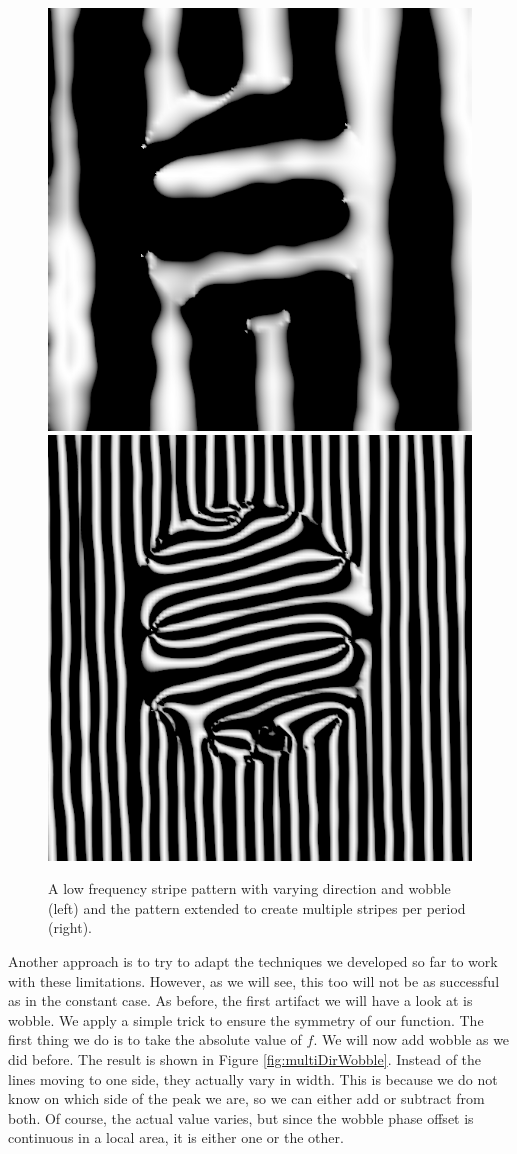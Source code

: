 \documentclass{utue} %
\begin{document}
\begin{figure}[ht]
  \centering
  \includegraphics[width=0.49\linewidth]{images/multiStripe}
  \includegraphics[width=0.49\linewidth]{images/multiStripeMulti}
  \caption{A low frequency stripe pattern with varying direction and wobble (left) and the pattern extended to create multiple stripes per period (right).}\label{fig:multiStripe}
\end{figure}

Another approach is to try to adapt the techniques we developed so far to work with these limitations. However, as we will see, this too will not be as successful as in the constant case. As before, the first artifact we will have a look at is wobble. We apply a simple trick to ensure the symmetry of our function. The first thing we do is to take the absolute value of $f$. We will now add wobble as we did before. The result is shown in Figure \ref{fig:multiDirWobble}. Instead of the lines moving to one side, they actually vary in width. This is because we do not know on which side of the peak we are, so we can either add or subtract from both. Of course, the actual value varies, but since the wobble phase offset is continuous in a local area, it is either one or the other.
\end{document}
